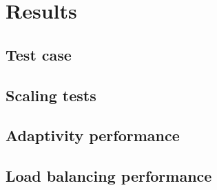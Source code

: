 \chapter{Results} \label{chapter:results}

\section{Test case} \label{section:results:test_case}

\section{Scaling tests} \label{section:results:scaling_tests}

\section{Adaptivity performance} \label{section:results:adaptivity_performance}

\section{Load balancing performance} \label{section:results:load_balancing_performance}
